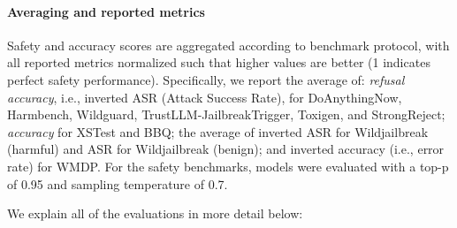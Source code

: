 \documentclass[table]{ai2style/ai2}
\begin{document}
{{\paragraph{Averaging and reported metrics} Safety and accuracy scores are aggregated according to benchmark protocol, with all reported metrics normalized such that higher values are better (1 indicates perfect safety performance).
Specifically, we report the average of: \textit{refusal accuracy}, i.e., inverted ASR (Attack Success Rate), for DoAnythingNow, Harmbench, Wildguard, TrustLLM-JailbreakTrigger, Toxigen, and StrongReject; \textit{accuracy} for XSTest and BBQ; the average of inverted ASR for Wildjailbreak (harmful) and ASR for Wildjailbreak (benign); and inverted accuracy (i.e., error rate) for WMDP.
For the safety benchmarks, models were evaluated with a top-p of 0.95 and sampling temperature of 0.7.

We explain all of the evaluations in more detail below:

}}
\end{document}
